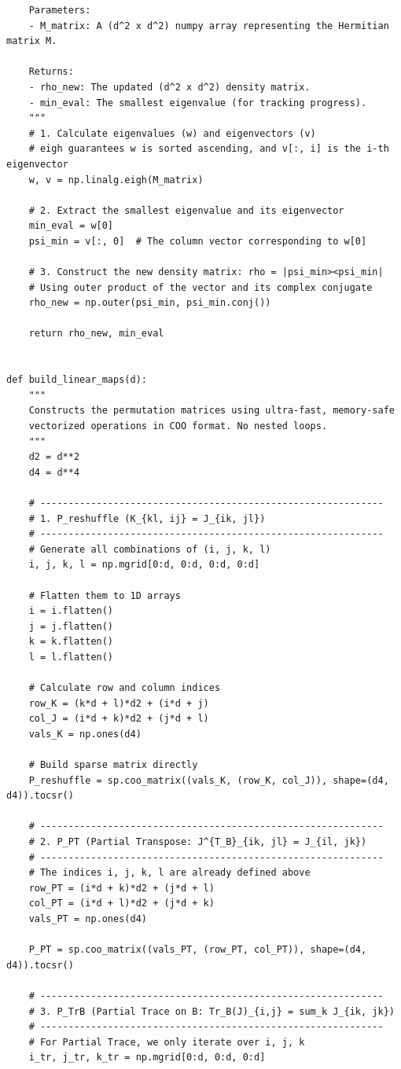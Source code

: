 \begin{lstlisting}
    Parameters:
    - M_matrix: A (d^2 x d^2) numpy array representing the Hermitian matrix M.
    
    Returns:
    - rho_new: The updated (d^2 x d^2) density matrix.
    - min_eval: The smallest eigenvalue (for tracking progress).
    """
    # 1. Calculate eigenvalues (w) and eigenvectors (v)
    # eigh guarantees w is sorted ascending, and v[:, i] is the i-th eigenvector
    w, v = np.linalg.eigh(M_matrix)
    
    # 2. Extract the smallest eigenvalue and its eigenvector
    min_eval = w[0]
    psi_min = v[:, 0]  # The column vector corresponding to w[0]
    
    # 3. Construct the new density matrix: rho = |psi_min><psi_min|
    # Using outer product of the vector and its complex conjugate
    rho_new = np.outer(psi_min, psi_min.conj())
    
    return rho_new, min_eval


def build_linear_maps(d):
    """
    Constructs the permutation matrices using ultra-fast, memory-safe 
    vectorized operations in COO format. No nested loops.
    """
    d2 = d**2
    d4 = d**4
    
    # -------------------------------------------------------------
    # 1. P_reshuffle (K_{kl, ij} = J_{ik, jl})
    # -------------------------------------------------------------
    # Generate all combinations of (i, j, k, l)
    i, j, k, l = np.mgrid[0:d, 0:d, 0:d, 0:d]
    
    # Flatten them to 1D arrays
    i = i.flatten()
    j = j.flatten()
    k = k.flatten()
    l = l.flatten()
    
    # Calculate row and column indices
    row_K = (k*d + l)*d2 + (i*d + j)
    col_J = (i*d + k)*d2 + (j*d + l)
    vals_K = np.ones(d4)
    
    # Build sparse matrix directly
    P_reshuffle = sp.coo_matrix((vals_K, (row_K, col_J)), shape=(d4, d4)).tocsr()
    
    # -------------------------------------------------------------
    # 2. P_PT (Partial Transpose: J^{T_B}_{ik, jl} = J_{il, jk})
    # -------------------------------------------------------------
    # The indices i, j, k, l are already defined above
    row_PT = (i*d + k)*d2 + (j*d + l)
    col_PT = (i*d + l)*d2 + (j*d + k)
    vals_PT = np.ones(d4)
    
    P_PT = sp.coo_matrix((vals_PT, (row_PT, col_PT)), shape=(d4, d4)).tocsr()
    
    # -------------------------------------------------------------
    # 3. P_TrB (Partial Trace on B: Tr_B(J)_{i,j} = sum_k J_{ik, jk})
    # -------------------------------------------------------------
    # For Partial Trace, we only iterate over i, j, k
    i_tr, j_tr, k_tr = np.mgrid[0:d, 0:d, 0:d]
    

\end{lstlisting}
